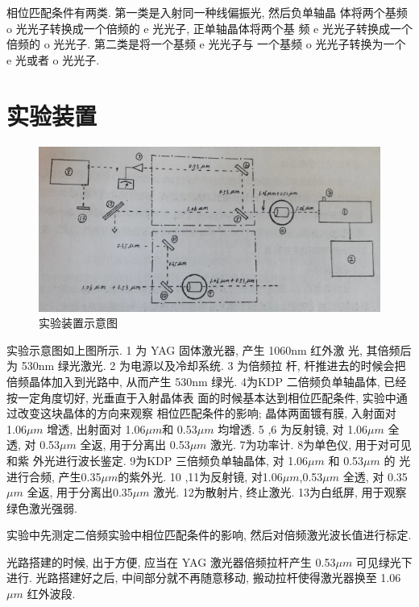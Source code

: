 \documentclass[aps,pre,12pt,preprint,%
	onecolumn,showpacs,showkeys,nofootinbib]{revtex4-2}
\begin{document}
        \par 相位匹配条件有两类. 第一类是入射同一种线偏振光, 然后负单轴晶
        体将两个基频 o 光光子转换成一个倍频的 e 光光子, 正单轴晶体将两个基
        频 e 光光子转换成一个倍频的 o 光光子. 第二类是将一个基频 e 光光子与
        一个基频 o 光光子转换为一个 e 光或者 o 光光子.
\section{实验装置}
\begin{figure}[!h]
    	\centering
    	\includegraphics[width=1.0\linewidth]{img/3.png}
    	\caption[实验装置示意图]{实验装置示意图}\vspace{1ex}
        \end{figure}
        \par 实验示意图如上图所示. 1 为 YAG 固体激光器, 产生 1060nm 红外激
        光, 其倍频后为 530nm 绿光激光. 2 为电源以及冷却系统. 3 为倍频拉
        杆, 杆推进去的时候会把倍频晶体加入到光路中, 从而产生 530nm 绿光.
        4为KDP 二倍频负单轴晶体, 已经按一定角度切好, 光垂直于入射晶体表
        面的时候基本达到相位匹配条件, 实验中通过改变这块晶体的方向来观察
        相位匹配条件的影响; 晶体两面镀有膜, 入射面对 1.06$\mu m$ 增透, 出射面对
        1.06$\mu m$和 0.53$\mu m$ 均增透. 5 ,6 为反射镜, 对 1.06$\mu m$ 全透, 对 0.53$\mu m$
        全返, 用于分离出 0.53$\mu m$ 激光. 7为功率计. 8为单色仪, 用于对可见和紫
        外光进行波长鉴定. 9为KDP 三倍频负单轴晶体, 对 1.06$\mu m$ 和 0.53$\mu m$ 的
        光进行合频, 产生0.35$\mu m$的紫外光. 10 ,11为反射镜, 对1.06$\mu m$,0.53$\mu m$
        全透, 对 0.35$\mu m$ 全返, 用于分离出0.35$\mu m$ 激光. 12为散射片, 终止激光.
        13为白纸屏, 用于观察绿色激光强弱.
        \par 实验中先测定二倍频实验中相位匹配条件的影响, 然后对倍频激光波长值进行标定.
        \par 光路搭建的时候, 出于方便, 应当在 YAG 激光器倍频拉杆产生 0.53$\mu m$
        可见绿光下进行. 光路搭建好之后, 中间部分就不再随意移动, 搬动拉杆使得激光器换至 1.06$\mu m$ 红外波段.
\end{document}
